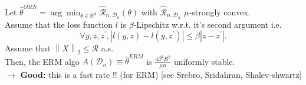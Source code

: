 \begin{thm}[]
    Let $ \hat{\theta }^{ORN} = \arg \min _{\theta \in \mathbb{R}^d} \hat{\mathcal{R}}_{n,\mathcal{D}_n} (\theta )$ with $ \hat{\mathcal{R}}_{n,\mathcal{D}_n} $  $ \mu  $-strongly convex. \\
    Assume that the loss function $ l  $ is $ \beta  $-Lipschitz w.r.t. it's second argument i.e.
    \[
        \forall y, z, z^\prime , \left| l(y,z) - l(y,z^\prime ) \right| \leq \beta \left| z - z^\prime  \right| 
    .\]
    Assume that $ \left\| X \right\| _2 \leq \mathcal{R} $ a.s. \\
    Then, the ERM algo $ A(\mathcal{D}_n) \equiv \hat{\theta }^{ERM} $   is $ \frac{4 \beta ^2 R^2}{\mu n} $ uniformly stable.\\ 
    $\rightarrow$ \textbf{Good:} this is a fast rate !! (for ERM) [see Srebro, Sridahran, Shalev-shwartz]
\end{thm}

